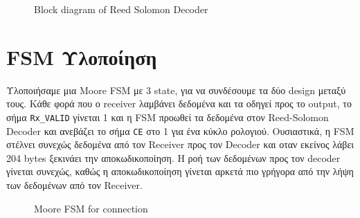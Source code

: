 \documentclass[12pt,a4paper]{article}
\begin{document}
    \begin{figure} [H]
     	\caption{Block diagram of Reed Solomon Decoder}
     	\label{Block diagram of Reed Solomon Decoder}
     \end{figure}


    \section{\textcolor{PineGreen}{FSM Υλοποίηση}}
    Υλοποιήσαμε μια Moore FSM με 3 state, για να συνδέσουμε τα δύο design μεταξύ τους. Κάθε φορά που ο receiver λαμβάνει δεδομένα και τα οδηγεί προς το output, το σήμα \verb|Rx_VALID| γίνεται 1 και η FSM προωθεί τα δεδομένα στον Reed-Solomon Decoder και ανεβάζει το σήμα \verb|CE| στο 1 για ένα κύκλο ρολογιού. Ουσιαστικά, η FSM στέλνει συνεχώς δεδομένα από τον Receiver προς τον Decoder και οταν εκείνος λάβει 204 bytes ξεκινάει την αποκωδικοποίηση. Η ροή των δεδομένων προς τον decoder γίνεται συνεχώς, καθώς η αποκωδικοποίηση γίνεται αρκετά πιο γρήγορα από την λήψη των δεδομένων από τον Receiver.

    \begin{figure} [H]
     	\caption{Moore FSM for connection}
     	\label{Moore FSM for connection}
     \end{figure}
\end{document}
